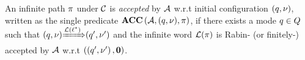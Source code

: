 \begin{definition}\label{def:fnacc}
An infinite path $\pi$ under $\mathcal{C}$ is \emph{accepted} by $\mathcal{A}$ w.r.t
initial configuration $(q,\nu)$, written as the single predicate $\mbox{\bf ACC} \left( {\mathcal{A}}, {(q,\nu)}, {\pi} \right)$,
if there exists a mode $q\in Q$ such that ${(q,\nu)}{\xRightarrow{\mathcal{L}(\ell^*)}}{(q',\nu')}$ and
the infinite word $\mathcal{L}(\pi)$ is Rabin- (or finitely-) accepted by $\mathcal{A}$ w.r.t
$
\left(\left(q',\nu'\right),\mathbf{0}\right)
$.
\end{definition}

